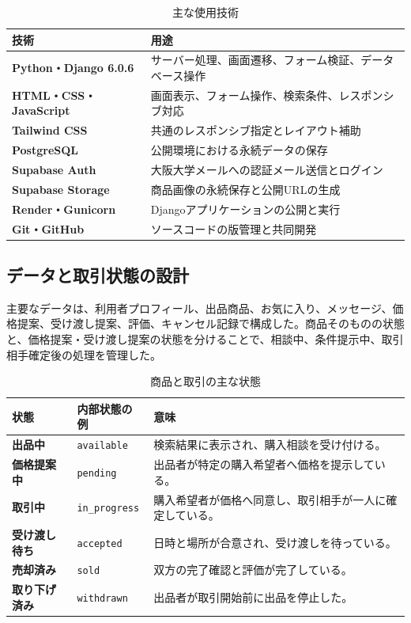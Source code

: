 \documentclass[11pt,a4paper]{article}
\begin{document}
\begin{table}[H]
  \centering
  \caption{主な使用技術}
  \begin{tabularx}{\textwidth}{>{\bfseries}p{}X}
    \toprule
    技術 & 用途\\
    \midrule
    Python・Django 6.0.6 & サーバー処理、画面遷移、フォーム検証、データベース操作\\
    HTML・CSS・JavaScript & 画面表示、フォーム操作、検索条件、レスポンシブ対応\\
    Tailwind CSS & 共通のレスポンシブ指定とレイアウト補助\\
    PostgreSQL & 公開環境における永続データの保存\\
    Supabase Auth & 大阪大学メールへの認証メール送信とログイン\\
    Supabase Storage & 商品画像の永続保存と公開URLの生成\\
    Render・Gunicorn & Djangoアプリケーションの公開と実行\\
    Git・GitHub & ソースコードの版管理と共同開発\\
    \bottomrule
  \end{tabularx}
\end{table}

\subsection{データと取引状態の設計}

主要なデータは、利用者プロフィール、出品商品、お気に入り、メッセージ、価格提案、受け渡し提案、評価、キャンセル記録で構成した。商品そのものの状態と、価格提案・受け渡し提案の状態を分けることで、相談中、条件提示中、取引相手確定後の処理を管理した。

\begin{table}[H]
  \centering
  \caption{商品と取引の主な状態}
  \begin{tabularx}{\textwidth}{>{\bfseries}p{}p{}X}
    \toprule
    状態 & 内部状態の例 & 意味\\
    \midrule
    出品中 & \texttt{available} & 検索結果に表示され、購入相談を受け付ける。\\
    価格提案中 & \texttt{pending} & 出品者が特定の購入希望者へ価格を提示している。\\
    取引中 & \texttt{in\_progress} & 購入希望者が価格へ同意し、取引相手が一人に確定している。\\
    受け渡し待ち & \texttt{accepted} & 日時と場所が合意され、受け渡しを待っている。\\
    売却済み & \texttt{sold} & 双方の完了確認と評価が完了している。\\
    取り下げ済み & \texttt{withdrawn} & 出品者が取引開始前に出品を停止した。\\
    \bottomrule
  \end{tabularx}
\end{table}
\end{document}
